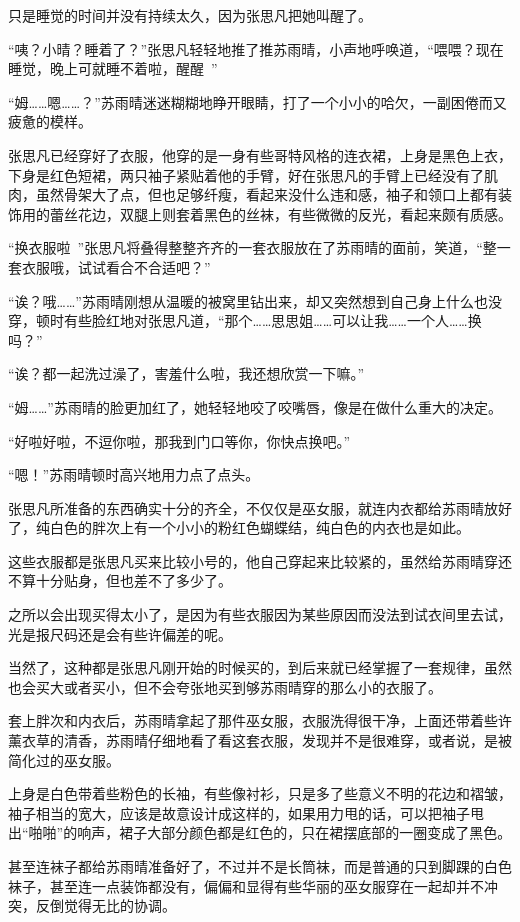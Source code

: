 只是睡觉的时间并没有持续太久，因为张思凡把她叫醒了。

“咦？小晴？睡着了？”张思凡轻轻地推了推苏雨晴，小声地呼唤道，“喂喂？现在睡觉，晚上可就睡不着啦，醒醒~”

“姆……嗯……？”苏雨晴迷迷糊糊地睁开眼睛，打了一个小小的哈欠，一副困倦而又疲惫的模样。

张思凡已经穿好了衣服，他穿的是一身有些哥特风格的连衣裙，上身是黑色上衣，下身是红色短裙，两只袖子紧贴着他的手臂，好在张思凡的手臂上已经没有了肌肉，虽然骨架大了点，但也足够纤瘦，看起来没什么违和感，袖子和领口上都有装饰用的蕾丝花边，双腿上则套着黑色的丝袜，有些微微的反光，看起来颇有质感。

“换衣服啦~”张思凡将叠得整整齐齐的一套衣服放在了苏雨晴的面前，笑道，“整一套衣服哦，试试看合不合适吧？”

“诶？哦……”苏雨晴刚想从温暖的被窝里钻出来，却又突然想到自己身上什么也没穿，顿时有些脸红地对张思凡道，“那个……思思姐……可以让我……一个人……换吗？”

“诶？都一起洗过澡了，害羞什么啦，我还想欣赏一下嘛。”

“姆……”苏雨晴的脸更加红了，她轻轻地咬了咬嘴唇，像是在做什么重大的决定。

“好啦好啦，不逗你啦，那我到门口等你，你快点换吧。”

“嗯！”苏雨晴顿时高兴地用力点了点头。

张思凡所准备的东西确实十分的齐全，不仅仅是巫女服，就连内衣都给苏雨晴放好了，纯白色的胖次上有一个小小的粉红色蝴蝶结，纯白色的内衣也是如此。

这些衣服都是张思凡买来比较小号的，他自己穿起来比较紧的，虽然给苏雨晴穿还不算十分贴身，但也差不了多少了。

之所以会出现买得太小了，是因为有些衣服因为某些原因而没法到试衣间里去试，光是报尺码还是会有些许偏差的呢。

当然了，这种都是张思凡刚开始的时候买的，到后来就已经掌握了一套规律，虽然也会买大或者买小，但不会夸张地买到够苏雨晴穿的那么小的衣服了。

套上胖次和内衣后，苏雨晴拿起了那件巫女服，衣服洗得很干净，上面还带着些许薰衣草的清香，苏雨晴仔细地看了看这套衣服，发现并不是很难穿，或者说，是被简化过的巫女服。

上身是白色带着些粉色的长袖，有些像衬衫，只是多了些意义不明的花边和褶皱，袖子相当的宽大，应该是故意设计成这样的，如果用力甩的话，可以把袖子甩出“啪啪”的响声，裙子大部分颜色都是红色的，只在裙摆底部的一圈变成了黑色。

甚至连袜子都给苏雨晴准备好了，不过并不是长筒袜，而是普通的只到脚踝的白色袜子，甚至连一点装饰都没有，偏偏和显得有些华丽的巫女服穿在一起却并不冲突，反倒觉得无比的协调。

